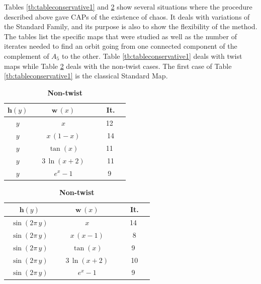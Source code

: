 \documentclass[12pt,a4paper]{amsart}
\theoremstyle{definition}
\theoremstyle{remark}
\begin{document}
\smallskip
 
Tables \ref{tb:tableconservative1} and \ref{tb:tableconservative2}  show several situations where the procedure described above gave CAPs of the existence of chaos. It deals with variations of the Standard Family, and its purpose is also to show the flexibility of the method. The tables list the specific maps that were studied as well as the number of iterates needed to find an orbit going from one connected component of the complement of $A_5$ to the other. 
Table \ref{tb:tableconservative1} deals with twist maps while Table \ref{tb:tableconservative2} deals with the non-twist cases.
The first case of Table \ref{tb:tableconservative1} is the classical
Standard Map. 

\large
\begin{table}[ht]
\begin{centering}
\begin{minipage}{0.43\textwidth}
\begin{tabular}{|c|c|c|}\hline
$\textbf{h}(y)$ & $\textbf{w}\,(x)$ & \textbf{It.}\\ \hline
\ \ $y$\ \ &\ \ $x$\ \ &\ \ 12 \ \ \\\hline
\ \ $y$\ \ &\ \ $x\,(1-x)$\ \ &\ \ 14\ \ \\\hline
\ \ $y$\ \ &\ \ $\tan(x)$\ \ &\ \ 11 \ \ \\\hline
\ \ $y$\ \ &\ \ $3\,\ln(x+2)$\ \ & \ \ 11\ \ \\\hline
\ \ $y$\ \ &\ \ $e^x-1$\ \ &\ \ 9 \ \ \\\hline
\end{tabular}
\caption{\textbf{Twist}}
\label{tb:tableconservative1}
\end{minipage}
\hfill
\begin{minipage}{0.45\textwidth}
\begin{tabular}{|c|c|c|}\hline
$\textbf{h}(y)$ & $\textbf{w}\,(x)$ & \textbf{It. }\\ \hline
\ $\sin(2\pi\,y)$\ &\ \ $x$\ \ &\ \ 14 \ \ \\\hline
\ $\sin(2\pi\,y)$\ &\ \ $x\,(x-1)$\ \ &\ \ 8\ \ \\\hline
\ $\sin(2\pi\,y)$\ &\ \ $\tan(x)$\ \ &\ \ 9 \ \ \\\hline
\ $\sin(2\pi\,y)$\ &\ \ $3\,\ln(x+2)$\ \ & \ \ 10\ \ \\\hline
\ $\sin(2\pi\,y)$\ &\ \ $e^x-1$\ \ &\ \ 9 \ \ \\\hline
\end{tabular}
\caption{\textbf{Non-twist}}
\label{tb:tableconservative2}
\end{minipage}
\end{centering}
\end{table}
\end{document}
